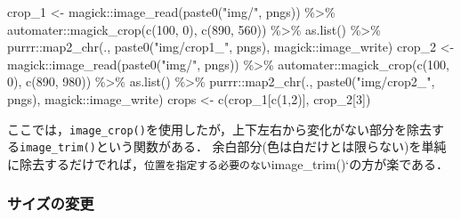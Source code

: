 \documentclass[
]{article}
\newenvironment{Shaded}{\begin{snugshade}}{\end{snugshade}}
\newcommand{\DecValTok}[1]{\textcolor[rgb]{0.00,0.00,0.81}{#1}}
\newcommand{\FunctionTok}[1]{\textcolor[rgb]{0.00,0.00,0.00}{#1}}
\newcommand{\NormalTok}[1]{#1}
\newcommand{\OtherTok}[1]{\textcolor[rgb]{0.56,0.35,0.01}{#1}}
\newcommand{\SpecialCharTok}[1]{\textcolor[rgb]{0.00,0.00,0.00}{#1}}
\newcommand{\StringTok}[1]{\textcolor[rgb]{0.31,0.60,0.02}{#1}}
\begin{document}
\begin{Shaded}
\begin{Highlighting}[]
\NormalTok{crop\_1 }\OtherTok{\textless{}{-}} 
\NormalTok{  magick}\SpecialCharTok{::}\FunctionTok{image\_read}\NormalTok{(}\FunctionTok{paste0}\NormalTok{(}\StringTok{"img/"}\NormalTok{, pngs)) }\SpecialCharTok{\%\textgreater{}\%}
\NormalTok{  automater}\SpecialCharTok{::}\FunctionTok{magick\_crop}\NormalTok{(}\FunctionTok{c}\NormalTok{(}\DecValTok{100}\NormalTok{, }\DecValTok{0}\NormalTok{), }\FunctionTok{c}\NormalTok{(}\DecValTok{890}\NormalTok{, }\DecValTok{560}\NormalTok{)) }\SpecialCharTok{\%\textgreater{}\%}
  \FunctionTok{as.list}\NormalTok{() }\SpecialCharTok{\%\textgreater{}\%}
\NormalTok{  purrr}\SpecialCharTok{::}\FunctionTok{map2\_chr}\NormalTok{(., }\FunctionTok{paste0}\NormalTok{(}\StringTok{"img/crop1\_"}\NormalTok{, pngs), magick}\SpecialCharTok{::}\NormalTok{image\_write)}
\NormalTok{crop\_2 }\OtherTok{\textless{}{-}} 
\NormalTok{  magick}\SpecialCharTok{::}\FunctionTok{image\_read}\NormalTok{(}\FunctionTok{paste0}\NormalTok{(}\StringTok{"img/"}\NormalTok{, pngs)) }\SpecialCharTok{\%\textgreater{}\%}
\NormalTok{  automater}\SpecialCharTok{::}\FunctionTok{magick\_crop}\NormalTok{(}\FunctionTok{c}\NormalTok{(}\DecValTok{100}\NormalTok{, }\DecValTok{0}\NormalTok{), }\FunctionTok{c}\NormalTok{(}\DecValTok{890}\NormalTok{, }\DecValTok{980}\NormalTok{)) }\SpecialCharTok{\%\textgreater{}\%}
  \FunctionTok{as.list}\NormalTok{() }\SpecialCharTok{\%\textgreater{}\%}
\NormalTok{  purrr}\SpecialCharTok{::}\FunctionTok{map2\_chr}\NormalTok{(., }\FunctionTok{paste0}\NormalTok{(}\StringTok{"img/crop2\_"}\NormalTok{, pngs), magick}\SpecialCharTok{::}\NormalTok{image\_write)}
\NormalTok{crops }\OtherTok{\textless{}{-}} \FunctionTok{c}\NormalTok{(crop\_1[}\FunctionTok{c}\NormalTok{(}\DecValTok{1}\NormalTok{,}\DecValTok{2}\NormalTok{)], crop\_2[}\DecValTok{3}\NormalTok{])}
\end{Highlighting}
\end{Shaded}

ここでは，\texttt{image\_crop()}を使用したが，上下左右から変化がない部分を除去する\texttt{image\_trim()}という関数がある．
余白部分(色は白だけとは限らない)を単純に除去するだけでれば，\texttt{位置を指定する必要のない}image\_trim()`の方が楽である．

\hypertarget{ux30b5ux30a4ux30baux306eux5909ux66f4}{%
\subsubsection{サイズの変更}\label{ux30b5ux30a4ux30baux306eux5909ux66f4}}
\end{document}
